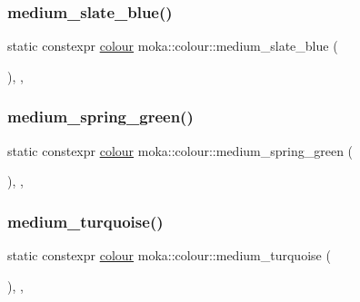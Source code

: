 \mbox{\label{classmoka_1_1colour_a05b97af96e7840d17f41b7c44eae71f9}} 
\subsubsection{\texorpdfstring{medium\_slate\_blue()}{medium\_slate\_blue()}}
{\footnotesize\ttfamily static constexpr \mbox{\hyperlink{classmoka_1_1colour}{colour}} moka\+::colour\+::medium\+\_\+slate\+\_\+blue (\begin{DoxyParamCaption}{ }\end{DoxyParamCaption})\hspace{0.3cm}{\ttfamily [inline]}, {\ttfamily [static]}, {\ttfamily [noexcept]}}

\mbox{\label{classmoka_1_1colour_a50c874851964ba13bb4c0b3f8c1aca85}} 
\subsubsection{\texorpdfstring{medium\_spring\_green()}{medium\_spring\_green()}}
{\footnotesize\ttfamily static constexpr \mbox{\hyperlink{classmoka_1_1colour}{colour}} moka\+::colour\+::medium\+\_\+spring\+\_\+green (\begin{DoxyParamCaption}{ }\end{DoxyParamCaption})\hspace{0.3cm}{\ttfamily [inline]}, {\ttfamily [static]}, {\ttfamily [noexcept]}}

\mbox{\label{classmoka_1_1colour_a24f1d3a557f9ae55e4ba70a166893000}} 
\subsubsection{\texorpdfstring{medium\_turquoise()}{medium\_turquoise()}}
{\footnotesize\ttfamily static constexpr \mbox{\hyperlink{classmoka_1_1colour}{colour}} moka\+::colour\+::medium\+\_\+turquoise (\begin{DoxyParamCaption}{ }\end{DoxyParamCaption})\hspace{0.3cm}{\ttfamily [inline]}, {\ttfamily [static]}, {\ttfamily [noexcept]}}

